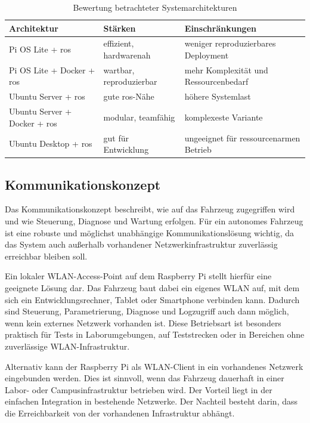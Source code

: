 \begin{table}[h]
    \centering
    \caption{Bewertung betrachteter Systemarchitekturen}
    \label{tab:systemarchitekturen}
    \begin{tabularx}{\textwidth}{lXX}
        \toprule
        \textbf{Architektur}                      & \textbf{Stärken}        & \textbf{Einschränkungen}               \\
        \midrule
        Pi OS Lite + \gls{ros}                    & effizient, hardwarenah  & weniger reproduzierbares Deployment    \\
        \hline Pi OS Lite + Docker + \gls{ros}    & wartbar, reproduzierbar & mehr Komplexität und Ressourcenbedarf  \\
        \hline Ubuntu Server + \gls{ros}          & gute \gls{ros}-Nähe     & höhere Systemlast                      \\
        \hline Ubuntu Server + Docker + \gls{ros} & modular, teamfähig      & komplexeste Variante                   \\
        \hline Ubuntu Desktop + \gls{ros}         & gut für Entwicklung     & ungeeignet für ressourcenarmen Betrieb \\
        \bottomrule
    \end{tabularx}
\end{table}

\subsection{Kommunikationskonzept}
\label{sec:kommunikationskonzept}

Das Kommunikationskonzept beschreibt, wie auf das Fahrzeug zugegriffen wird und wie Steuerung, Diagnose und Wartung erfolgen. Für ein autonomes Fahrzeug ist eine robuste und möglichst unabhängige Kommunikationslösung wichtig, da das System auch außerhalb vorhandener Netzwerkinfrastruktur zuverlässig erreichbar bleiben soll.

Ein lokaler WLAN-Access-Point auf dem Raspberry Pi stellt hierfür eine geeignete Lösung dar. Das Fahrzeug baut dabei ein eigenes WLAN auf, mit dem sich ein Entwicklungsrechner, Tablet oder Smartphone verbinden kann. Dadurch sind Steuerung, Parametrierung, Diagnose und Logzugriff auch dann möglich, wenn kein externes Netzwerk vorhanden ist. Diese Betriebsart ist besonders praktisch für Tests in Laborumgebungen, auf Teststrecken oder in Bereichen ohne zuverlässige WLAN-Infrastruktur.

Alternativ kann der Raspberry Pi als WLAN-Client in ein vorhandenes Netzwerk eingebunden werden. Dies ist sinnvoll, wenn das Fahrzeug dauerhaft in einer Labor- oder Campusinfrastruktur betrieben wird. Der Vorteil liegt in der einfachen Integration in bestehende Netzwerke. Der Nachteil besteht darin, dass die Erreichbarkeit von der vorhandenen Infrastruktur abhängt.

